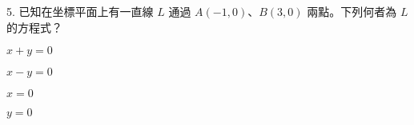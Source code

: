 \documentclass[12pt]{article}
\begin{document}
\begin{problem}
  \item[5.] 已知在坐標平面上有一直線 $L$ 通過 $A(-1,0)$、$B(3,0)$ 兩點。下列何者為 $L$ 的方程式？
  \begin{choices}
    \item $x + y = 0$
    \item $x - y = 0$
    \item $x = 0$
    \item $y = 0$
  \end{choices}
\end{problem}
\end{document}
